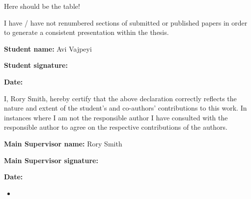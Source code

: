 {Here should be the table!

I have / have not renumbered sections of submitted or published papers
in order to generate a consistent presentation within the thesis.

\textbf{Student name:} Avi Vajpeyi

\textbf{Student signature:}

\textbf{Date:}

I, Rory Smith, hereby certify that the above declaration correctly reflects the
nature and extent of the student's and co-authors' contributions to this
work.
In instances where I am not the responsible author I have
consulted with the responsible author to agree on the respective
contributions of the authors.

\textbf{Main Supervisor name:} Rory Smith

\textbf{Main Supervisor signature:}

\textbf{Date:}



\begin{itemize}
\item
\end{itemize}














}
